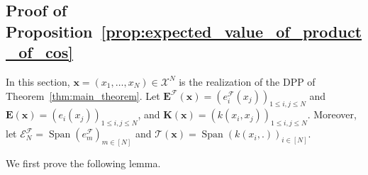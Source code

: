 \documentclass[twoside,11pt]{book}
\newtheorem{lemma}{Lemma}
\numberwithin{theorem}{chapter}
\numberwithin{definition}{chapter}
\numberwithin{proposition}{chapter}
\numberwithin{corollary}{chapter}
\numberwithin{example}{chapter}
\numberwithin{lemma}{chapter}
\numberwithin{assumption}{chapter}
\numberwithin{equation}{chapter}
\numberwithin{figure}{chapter}
\DeclareMathOperator{\Det}{Det}
\DeclareMathOperator{\Span}{\mathrm{Span}}
\DeclareMathOperator{\DPP}{\mathrm{DPP}}
\DeclareMathOperator{\EX}{\mathbb{E}}
\newcommand{\pc}[1]{\textcolor{blue}{#1}}
\begin{document}

\subsection{Proof of Proposition~\ref{prop:expected_value_of_product_of_cos}}
\label{s:proofOfExpectedProduct}
%

In this section, $\bm{x}  = (x_{1}, \dots , x_{N}) \in \mathcal{X}^{N}$ is the realization of the DPP of Theorem~\ref{thm:main_theorem}. Let $\bm{E}^{\mathcal{F}}(\bm{x}) = (e_{i}^{\mathcal{F}}(x_{j}))_{1 \leq i,j \leq N}$ and $\bm{E}(\bm{x}) = (e_{i}(x_{j}))_{1 \leq i,j \leq N}$, and $\bm{K}(\bm{x})= (k(x_{i},x_{j}))_{1 \leq i,j \leq N} $.
Moreover, let $\mathcal{E}^{\mathcal{F}}_{N} = \Span(e_{m}^{\mathcal{F}})_{m \in [N]}$ and $\mathcal{T}(\bm{x}) =  \Span \left( k(x_{i},.) \right)_{i \in [N]}$.

We first prove the following lemma.




\end{document}
